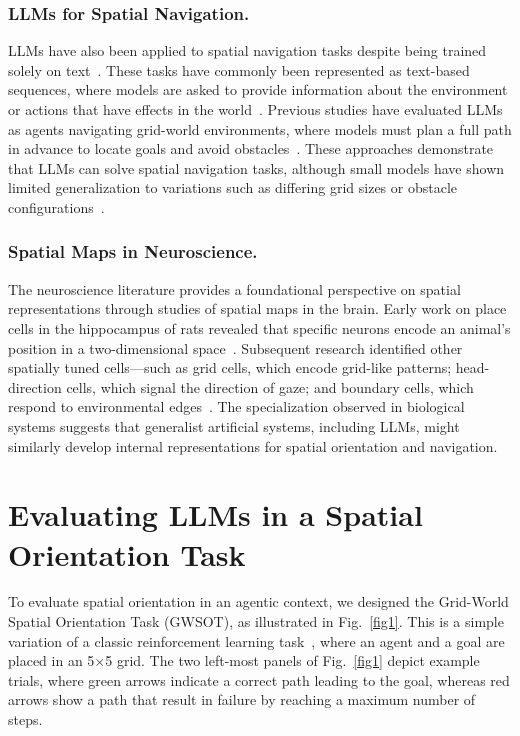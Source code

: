 \documentclass[runningheads]{llncs}
\begin{document}
\subsubsection{LLMs for Spatial Navigation.} LLMs have also been applied to spatial navigation tasks despite being trained solely on text~\cite{Cote2019,Huang2022}. These tasks have commonly been represented as text-based sequences, where models are asked to provide information about the environment or actions that have effects in the world~\cite{Zhu2023,Yamada2023,Lin2023}. Previous studies have evaluated LLMs as agents navigating grid-world environments, where models must plan a full path in advance to locate goals and avoid obstacles~\cite{Aghzal2023,McDonald2023}. These approaches demonstrate that LLMs can solve spatial navigation tasks, although small models have shown limited generalization to variations such as differing grid sizes or obstacle configurations~\cite{Aghzal2023}.

\subsubsection{Spatial Maps in Neuroscience.} The neuroscience literature provides a foundational perspective on spatial representations through studies of spatial maps in the brain. Early work on place cells in the hippocampus of rats revealed that specific neurons encode an animal’s position in a two-dimensional space~\cite{OKeefeDostrovsky1971,OKeefe1976}. Subsequent research identified other spatially tuned cells—such as grid cells, which encode grid-like patterns; head-direction cells, which signal the direction of gaze; and boundary cells, which respond to environmental edges~\cite{Hafting2005,Lever2009,Taube1990}. The specialization observed in biological systems suggests that generalist artificial systems, including LLMs, might similarly develop internal representations for spatial orientation and navigation.


\section{Evaluating LLMs in a Spatial Orientation Task}

To evaluate spatial orientation in an agentic context, we designed the Grid-World Spatial Orientation Task (GWSOT), as illustrated in Fig.~\ref{fig1}. This is a simple variation of a classic reinforcement learning task~\cite{ChevalierBoisvert2018,ChevalierBoisvert2024}, where an agent and a goal are placed in an 5×5 grid. The two left-most panels of Fig.~\ref{fig1} depict example trials, where green arrows indicate a correct path leading to the goal, whereas red arrows show a path that result in failure by reaching a maximum number of steps.
\end{document}
